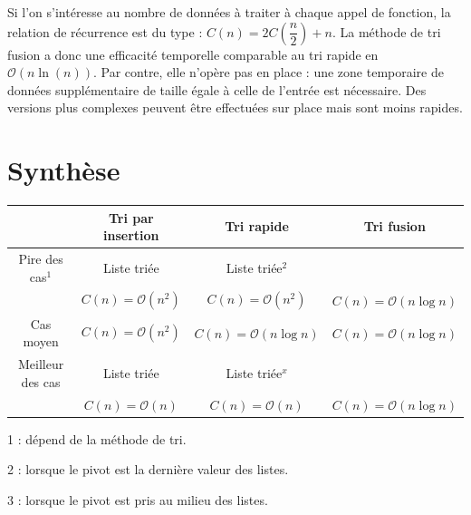 \documentclass[10pt,fleqn]{article} %
\begin{document}
Si l'on s'intéresse au nombre de données à traiter à chaque appel de fonction, la relation de récurrence est du type :
$C(n) = 2 C\left(\dfrac{n}{2}\right)  +  n$.
La méthode de tri fusion a donc une efficacité temporelle comparable au tri rapide en $\mathcal{O}\left(n \ln(n)\right)$. Par contre, elle n'opère pas en place : une zone temporaire de données supplémentaire de taille égale à celle de l'entrée est nécessaire. Des versions plus complexes peuvent être effectuées sur place mais sont moins rapides.










\section{Synthèse}

\begin{center}
\begin{tabular}{|c|c|c|c|}
\hline
& Tri par insertion & Tri rapide & Tri fusion \\
\hline 
{Pire des cas$^1$} &  Liste triée& Liste triée$^2$ & \\ 
&  $ C(n)=\mathcal{O}\left(n^2 \right)$ & $ C(n)=\mathcal{O}\left(n^2 \right)$ & $ C(n)=\mathcal{O}\left(n \log n\right)$ \\ \hline
Cas moyen & $ C(n)=\mathcal{O}\left(n^2 \right)$ &$ C(n)=\mathcal{O}\left(n \log n\right)$  & $ C(n)=\mathcal{O}\left(n \log n\right)$ \\ \hline
Meilleur des cas  & Liste triée & Liste triée$^x$ & \\ 
  & $ C(n)=\mathcal{O}\left(n \right)$ & $ C(n)=\mathcal{O}\left(n \right)$ & $ C(n)=\mathcal{O}\left(n \log n\right)$ \\ \hline
\end{tabular}
\end{center}

\footnotesize{1 : dépend de la méthode de tri.}

\footnotesize{2 : lorsque le pivot est la dernière valeur des listes.}

\footnotesize{3 : lorsque le pivot est pris au milieu des listes.}

\begin{thebibliography}{2}

\end{thebibliography}
\end{document}
